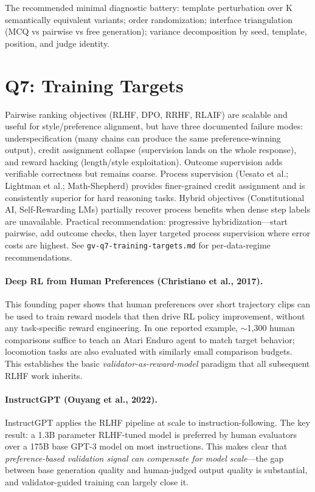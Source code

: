 \documentclass[11pt]{article}
\begin{document}
The recommended minimal diagnostic battery: template perturbation over K semantically equivalent variants; order randomization; interface triangulation (MCQ vs pairwise vs free generation); variance decomposition by seed, template, position, and judge identity.

\section{Q7: Training Targets}

Pairwise ranking objectives (RLHF, DPO, RRHF, RLAIF) are scalable and useful for style/preference alignment, but have three documented failure modes: underspecification (many chains can produce the same preference-winning output), credit assignment collapse (supervision lands on the whole response), and reward hacking (length/style exploitation). Outcome supervision adds verifiable correctness but remains coarse. Process supervision (Uesato et al.; Lightman et al.; Math-Shepherd) provides finer-grained credit assignment and is consistently superior for hard reasoning tasks. Hybrid objectives (Constitutional AI, Self-Rewarding LMs) partially recover process benefits when dense step labels are unavailable. Practical recommendation: progressive hybridization---start pairwise, add outcome checks, then layer targeted process supervision where error costs are highest. See \texttt{gv-q7-training-targets.md} for per-data-regime recommendations.

\paragraph{Deep RL from Human Preferences (Christiano et al., 2017).}
This founding paper shows that human preferences over short trajectory clips can be used to train reward models that then drive RL policy improvement, without any task-specific reward engineering. In one reported example, $\sim$1,300 human comparisons suffice to teach an Atari Enduro agent to match target behavior; locomotion tasks are also evaluated with similarly small comparison budgets. This establishes the basic \emph{validator-as-reward-model} paradigm that all subsequent RLHF work inherits.

\paragraph{InstructGPT (Ouyang et al., 2022).}
InstructGPT applies the RLHF pipeline at scale to instruction-following. The key result: a 1.3B parameter RLHF-tuned model is preferred by human evaluators over a 175B base GPT-3 model on most instructions. This makes clear that \emph{preference-based validation signal can compensate for model scale}---the gap between base generation quality and human-judged output quality is substantial, and validator-guided training can largely close it.
\end{document}
